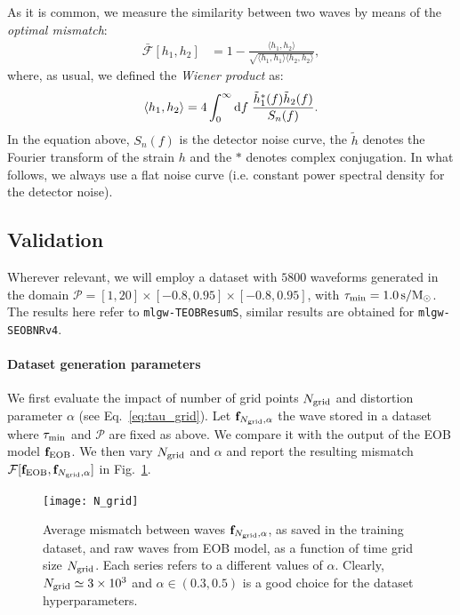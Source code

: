 As it is common, we measure the similarity between two waves by means of the \textit{optimal mismatch}:
\begin{align}
	\bar{\mathcal{F}}[h_1,h_2] & = 1- \frac{\langle h_1, h_2 \rangle}{\sqrt{\langle h_1, h_1 \rangle \langle h_2, h_2 \rangle}}, 	\label{eq:mismatch_def}
\end{align}
where, as usual, we defined the \textit{Wiener product} as:
\begin{equation}
	 {\langle h_1, h_2 \rangle} = 4 \int_0^\infty \operatorname{d}\!{f} \; \frac{\tilde{h}_1^*(f) \tilde{h}_2(f)}{S_n(f)}.
	\label{ew:Wiener}
\end{equation}
In the equation above, $S_n(f)$ is the detector noise curve, the $\tilde{h}$ denotes the Fourier transform of the 
strain $h$ and the $*$ denotes complex conjugation.
In what follows, we always use a flat noise curve (i.e. constant power spectral density for the detector noise).

\subsection{Validation}
\label{sec:validation}
Wherever relevant, we will employ a dataset with $5800$ waveforms generated in the domain $\mathcal{P} = [1,20]\times[-0.8,0.95]\times[-0.8,0.95]$, with $\tau_{\rm min} = \SI{1.0}{s/M_\odot}$. The results here refer to \texttt{mlgw-TEOBResumS}, similar results are obtained for \texttt{mlgw-SEOBNRv4}.
\paragraph{Dataset generation parameters}
We first evaluate the impact of number of grid points $N_{\rm grid}$ and distortion parameter $\alpha$ (see Eq.~\eqref{eq:tau_grid}).
Let $\mathbf{f}_{N_{\rm grid}, \alpha}$ the wave stored in a dataset where $\tau_{\rm min}$ and $\mathcal{P}$ are fixed as above. We compare it with the output of the EOB model $\mathbf{f}_{\rm EOB}$.
We then vary $N_{\rm grid}$ and $\alpha$ and report the resulting mismatch $\mathcal{F}[\mathbf{f}_{\rm EOB}, \mathbf{f}_{N_{\rm grid}, \alpha}]$ in Fig.~\ref{fig:N_grid}.
\begin{figure}[!t]
	\centering
	\texttt{[image: N\_grid]}
	\caption{Average mismatch between waves $\mathbf{f}_{N_{\rm grid}, \alpha}$, as saved in the training dataset, and raw waves from EOB model, as a function of time grid size $N_{\rm grid}$. Each series refers to a different values of $\alpha$.
	Clearly, $N_{\rm grid} \simeq 3 \times 10^{3}$ and $\alpha \in (0.3,0.5)$ is a good choice for the dataset hyperparameters.
}
	\label{fig:N_grid}
\end{figure}

